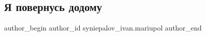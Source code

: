  
 
 
 
 

\subsection{Я повернусь додому}
\label{sec:11_02_2023.fb.syniepalov_ivan.mariupol.1.ya_povernus_dodomu}

\ifcmt
 author_begin
   author_id syniepalov_ivan.mariupol
 author_end
\fi
